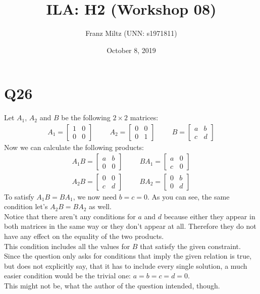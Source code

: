 \documentclass{article}
\title{ILA: H2 (Workshop 08)}
\author{Franz Miltz (UNN: s1971811)}
\date{October 8, 2019}
\begin{document}
\maketitle
\section*{Q26}
Let $A_1$, $A_2$ and $B$ be the following $2\times 2$ matrices:
\begin{align*}
    A_1 = \begin{bmatrix}
        1 &0 \\ 0 &0
    \end{bmatrix}
    \hspace{1cm} A_2 = \begin{bmatrix}
        0 &0 \\ 0 &1
    \end{bmatrix}
    \hspace{1cm} B = \begin{bmatrix}
        a &b \\ c &d
    \end{bmatrix}
\end{align*}
Now we can calculate the following products:
\begin{align*}
    A_1B = \begin{bmatrix}
        a &b \\0 &0
    \end{bmatrix}\hspace{1cm}
    BA_1 = \begin{bmatrix}
        a &0\\
        c &0
    \end{bmatrix}\\
    A_2B = \begin{bmatrix}
        0 &0\\
        c &d
    \end{bmatrix}\hspace{1cm}
    BA_2 = \begin{bmatrix}
        0 &b\\
        0 &d
    \end{bmatrix}
\end{align*}
To satisfy $A_1B=BA_1$, we now need $b = c = 0$. As you can see, the same condition let's $A_2B=BA_2$ as well.\\
Notice that there aren't any conditions for $a$ and $d$ because either they appear in both matrices in the same way or they don't appear at all.
Therefore they do not have any effect on the equality of the two products.\\
This condition includes all the values for $B$ that satisfy the given constraint. 
Since the question only asks for conditions that imply the given relation is true, but does not explicitly say, that it has to include every single solution, a much easier condition would be the trivial one: $a=b=c=d=0$.\\
This might not be, what the author of the question intended, though.
\end{document}
